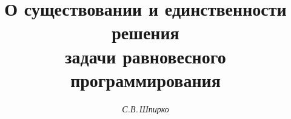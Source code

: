 




%





\newcommand{\argmin}{\operatorname{argmin}}


\newcommand{\tts}[1]{}







\setcounter{page}{79}















\author{\it С.В.\,Шпирко}




\title{О существовании и единственности решения\\


задачи равновесного программирования }





\date{}




\pagestyle{plain} %







\maketitle


\label{begin}








